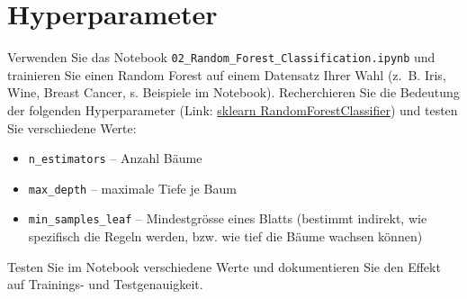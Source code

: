 \section{Hyperparameter}

\begin{myexercise}
    Verwenden Sie das Notebook \texttt{02\_Random\_Forest\_Classification.ipynb} und trainieren Sie einen Random Forest auf einem Datensatz Ihrer Wahl (z.~B. Iris, Wine, Breast Cancer, s. Beispiele im Notebook). Recherchieren Sie die Bedeutung der folgenden Hyperparameter (Link: \href{https://scikit-learn.org/stable/modules/generated/sklearn.ensemble.RandomForestClassifier.html}{sklearn RandomForestClassifier}) und testen Sie verschiedene Werte:

    \begin{itemize}
        \item \texttt{n\_estimators} -- Anzahl Bäume
        \item \texttt{max\_depth} -- maximale Tiefe je Baum
        \item \texttt{min\_samples\_leaf} -- Mindestgrösse eines Blatts (bestimmt indirekt, wie spezifisch die Regeln werden, bzw. wie tief die Bäume wachsen können)
    \end{itemize}
    Testen Sie im Notebook verschiedene Werte und dokumentieren Sie den Effekt
    auf Trainings- und Testgenauigkeit.


\end{myexercise}
